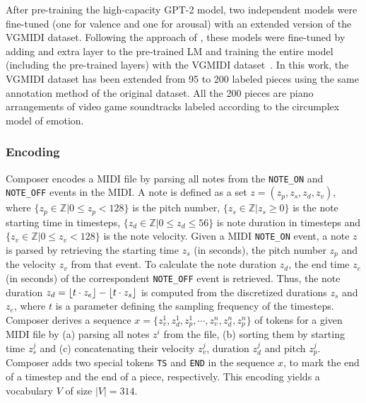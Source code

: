 After pre-training the high-capacity GPT-2 model, two independent models were fine-tuned (one for valence and one for arousal) with an extended version of the VGMIDI dataset\cite{ferreira_2019}. Following the approach of \citet{Radford2018}, these models were fine-tuned by adding and extra layer to the pre-trained LM and training the entire model (including the pre-trained layers) with the VGMIDI dataset~\cite{ferreira_2019}. In this work, the VGMIDI dataset has been extended from 95 to 200 labeled pieces using the same annotation method of the original dataset. All the 200 pieces are piano arrangements of video game soundtracks labeled according to the circumplex model of emotion.

\subsubsection{Encoding}

Composer encodes a MIDI file by parsing all notes from the \texttt{NOTE\_ON} and \texttt{NOTE\_OFF} events in the MIDI. A note is defined as a set $z = (z_p, z_s, z_d, z_v)$, where $\{z_p \in \mathbb{Z} \vert 0 \leq z_p < 128 \}$ is the pitch number, $\{z_s \in \mathbb{Z} \vert z_s \geq 0 \}$ is the note starting time in timesteps,  $\{z_d \in \mathbb{Z} \vert 0 \leq z_d \leq 56\}$ is note duration in timesteps and $\{z_v \in \mathbb{Z} \vert 0 \leq z_v < 128 \}$ is the note velocity. Given a MIDI \texttt{NOTE\_ON} event, a note $z$ is parsed by retrieving the starting time $z_s$ (in seconds), the pitch number $z_p$ and the velocity $z_v$ from that event. To calculate the note duration $z_d$, the end time $z_e$ (in seconds) of the correspondent \texttt{NOTE\_OFF} event is retrieved. Thus, the note duration $z_d = \lfloor t \cdot z_e\rfloor - \lfloor t \cdot z_s\rfloor$ is computed from the  discretized durations $z_s$ and $z_e$, where $t$ is a parameter defining the sampling frequency of the timesteps.
Composer derives a sequence $x = \{z_v^1, z_{d}^1, z_{p}^1, \cdots, z_v^n, z_{d}^n, z_p^n\}$ of tokens for a given MIDI file by (a) parsing all notes $z^i$ from the file, (b) sorting them by starting time $z_s^j$ and (c) concatenating their velocity $z_v^j$, duration $z_d^j$ and pitch $z_p^j$. Composer adds two special tokens \texttt{TS} and \texttt{END} in the sequence $x$, to mark the end of a timestep and the end of a piece, respectively. This encoding yields a vocabulary $V$ of size $|V| = 314$.


